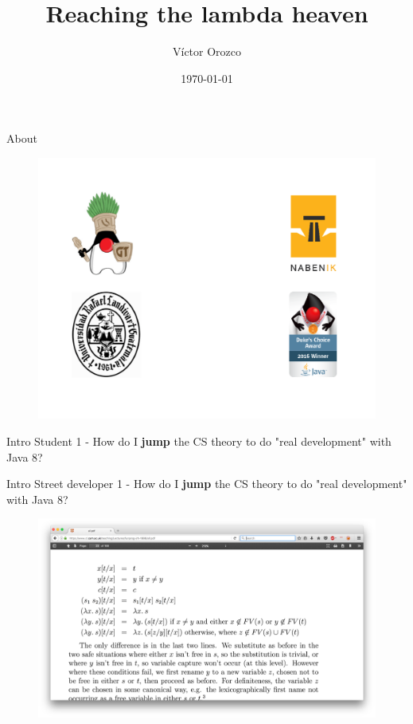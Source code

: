 \documentclass[14pt]{beamer}
\title{Reaching the lambda heaven}
\author{Víctor Orozco}
\institute{Nabenik}
\date{\today}
\begin{document}
\frame{\titlepage}



\begin{frame}{About}
\begin{figure}
	\centering
	\includegraphics[width=\linewidth]{Images/fescudos}
\end{figure}

\end{frame}

\begin{frame}{Intro}
    \huge Student 1 - How do I \textbf{jump} the CS theory to do "real development" with Java 8?
\end{frame}

\begin{frame}{Intro}
    \huge Street developer 1 - How do I \textbf{jump} the CS theory to do "real development" with Java 8?
\end{frame}

\begin{figure}
    \centering
    \includegraphics[width=\linewidth]{Images/calculus}
\end{figure}
\end{document}
